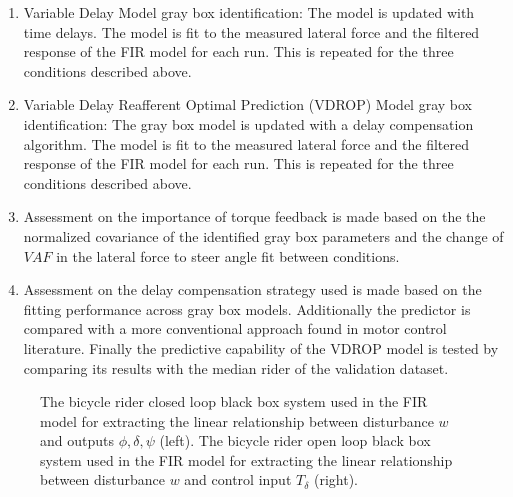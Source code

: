 \begin{enumerate}
    \item Variable Delay Model gray box identification: The model is updated with time delays. The model  is fit to the measured lateral force and the filtered response of the FIR model for each run. This is repeated for the three conditions described above. 
    \item  Variable Delay Reafferent Optimal Prediction (VDROP) Model gray box identification: The gray box model is updated with a delay compensation algorithm. The model is fit to the measured lateral force and the filtered response of the FIR model for each run. This is repeated for the three conditions described above.
    \item Assessment on the importance of torque feedback is made based on the the normalized covariance of the identified gray box parameters and the change of \ensuremath{\mathit{VAF}}  in the lateral force to steer angle fit between conditions.
    \item Assessment on the delay compensation strategy used is made based on the fitting performance across gray box models. Additionally the predictor is compared with a more conventional approach found in motor control literature. Finally the predictive capability of the VDROP model is tested by comparing its results with the median rider of the validation dataset. 

\end{enumerate}
\begin{figure}[h]
    \caption{The bicycle rider closed loop black box system used in the FIR model for extracting the linear relationship between disturbance \ensuremath{w} and outputs \ensuremath{\phi,\delta,\psi} (left). The bicycle rider open loop black box system used in the FIR model for extracting the linear relationship between disturbance \ensuremath{w} and control input \ensuremath{T_\delta} (right).  }
    \label{fig:blackbox}
\end{figure}



